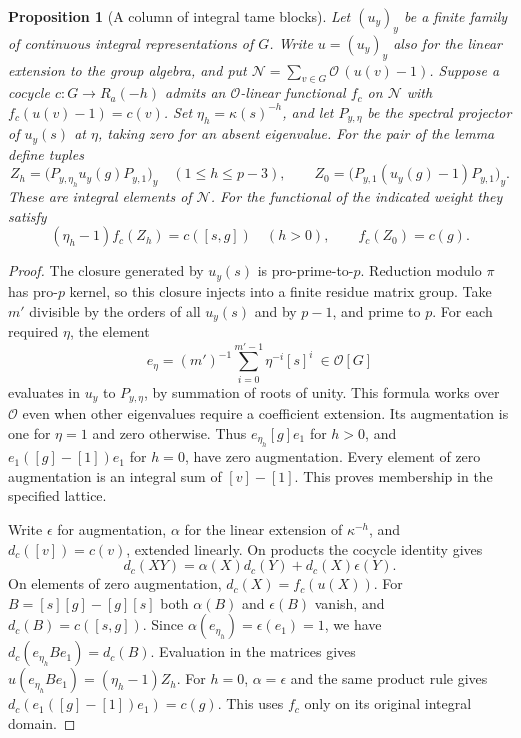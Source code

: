 \documentclass[a4paper,11pt]{article}
\newtheorem{proposition}{Proposition}[section]
\theoremstyle{definition}
\theoremstyle{remark}
\numberwithin{equation}{section}
\begin{document}
\begin{proposition}[A column of integral tame blocks]
\leavevmode\label{prop:tameblocks745}
Let \((u_y)_y\) be a finite family of continuous integral
representations of \(G\). Write \(u= (u_y)_y\) also for the
linear extension to the group algebra, and put
\(\mathcal N=\sum_{v\in G}\mathcal O\,(u(v)-1)\).
Suppose a cocycle \(c:G\to R_a(-h)\) admits an
\(\mathcal O\)-linear functional \(f_c\) on \(\mathcal N\)
with \(f_c(u(v)-1)=c(v)\). Set \(\eta_h=\kappa(s)^{-h}\),
and let \(P_{y,\eta}\) be the spectral projector of \(u_y(s)\)
at \(\eta\), taking zero for an absent eigenvalue. For the
pair of the lemma define tuples
\[
 Z_h=\big(P_{y,\eta_h}u_y(g)P_{y,1}\big)_y\quad(1\le h\le p-3),
 \qquad
 Z_0=\big(P_{y,1}(u_y(g)-1)P_{y,1}\big)_y .
\]
These are integral elements of \(\mathcal N\). For the functional
of the indicated weight they satisfy
\[
       (\eta_h-1)f_c(Z_h)=c([s,g])\quad(h>0),\qquad
                  f_c(Z_0)=c(g).
\]
\end{proposition}
\begin{proof}
The closure generated by \(u_y(s)\) is pro-prime-to-\(p\).
Reduction modulo \(\pi\) has pro-\(p\) kernel, so this closure
injects into a finite residue matrix group. Take \(m'\) divisible
by the orders of all \(u_y(s)\) and by \(p-1\), and prime to \(p\).
For each required \(\eta\), the element
\[
             e_\eta=(m')^{-1}\sum_{i=0}^{m'-1}\eta^{-i}[s]^i
                         \ \in\mathcal O[G]
\]
evaluates in \(u_y\) to \(P_{y,\eta}\), by summation of roots
of unity. This formula works over \(\mathcal O\) even when
other eigenvalues require a coefficient extension. Its augmentation
is one for \(\eta=1\) and zero otherwise. Thus
\(e_{\eta_h}[g]e_1\) for \(h>0\), and
\(e_1([g]-[1])e_1\) for \(h=0\), have zero augmentation.
Every element of zero augmentation is an integral sum of
\([v]-[1]\). This proves membership in the specified lattice.

Write \(\epsilon\) for augmentation, \(\alpha\) for the linear
extension of \(\kappa^{-h}\), and \(d_c([v])=c(v)\), extended
linearly. On products the cocycle identity gives
\[
       d_c(XY)=\alpha(X)d_c(Y)+d_c(X)\epsilon(Y).
\]
On elements of zero augmentation, \(d_c(X)=f_c(u(X))\).
For \(B=[s][g]-[g][s]\) both \(\alpha(B)\) and
\(\epsilon(B)\) vanish, and \(d_c(B)=c([s,g])\).
Since \(\alpha(e_{\eta_h})=\epsilon(e_1)=1\), we have
\(d_c(e_{\eta_h}Be_1)=d_c(B)\). Evaluation in the matrices
gives \(u(e_{\eta_h}Be_1)=(\eta_h-1)Z_h\).
For \(h=0\), \(\alpha=\epsilon\) and the same product rule
gives \(d_c(e_1([g]-[1])e_1)=c(g)\). This uses \(f_c\)
only on its original integral domain.
\end{proof}
\end{document}
